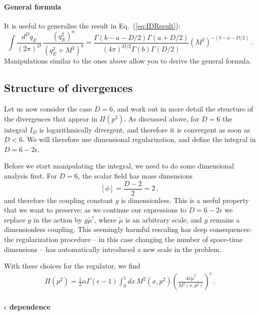 \paragraph{General formula}

It is useful to generalise the result in Eq.~(\ref{eq:IDResult}):
\begin{equation}
  \boxed{
  \int \frac{d^Dq_E}{(2\pi)^D}\,
  \frac{\left(q_E^2\right)^a}{\left(q_E^2+M^2\right)^b}
  = \frac{\Gamma(b-a-D/2) \Gamma(a+D/2)}{(4\pi)^{D/2} \Gamma(b)
  \Gamma(D/2)} \left(M^2\right)^{-(b-a-D/2)}\, .}
\end{equation}
Manipulations similar to the ones above allow you to derive the
general formula. 

\subsection{Structure of divergences}
\label{sec:struct-diverg}

Let us now consider the case $D=6$, and work out in more detail the
structure of the divergences that appear in $\Pi(p^2)$. As discussed
above, for $D=6$ the integral $I_D$ is logarithmically divergent, and
therefore it is convergent as soon as $D<6$. We will therefore use
dimensional regularization, and define the integral in
$D=6-2\epsilon$.

Before we start manipulating the integral, we need to do some
dimensional analysis first. For $D=6$, the scalar field has mass
dimensions
\[
  \left[\phi\right] = \frac{D-2}{2}= 2\, ,
\]
and therefore the coupling constant $g$ is dimensionless. This is a
useful property that we want to preserve; as we continue our
expressions to $D=6-2\epsilon$ we replace $g$ in the action by
$g\tilde{\mu}^\epsilon$, where $\tilde{\mu}$ is an arbitrary scale,
and $g$ remains a dimensionless coupling. This seemingly harmful
rescaling has deep consequences: the regularization procedure -- in
this case changing the number of space-time dimensions -- has
automatically introduced a new scale in the problem.

With these choices for the regulator, we find
\begin{align}
  \Pi(p^2) = \frac12 \alpha \Gamma(\epsilon-1) \int_0^1dx\,
  M^2(x,p^2)
  \left(\frac{4\pi\tilde{\mu}^2}{M^2(x,p^2)}\right)^\epsilon\, .
\end{align}

\paragraph{$\epsilon$ dependence}

